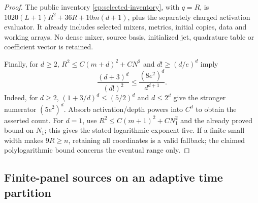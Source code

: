 \begin{proof}
The public inventory \eqref{cp:selected-inventory}, with $q=R$,
is $1020(L+1)R^2+36R+10m(d+1)$, plus the separately charged
activation evaluator. It already includes selected mixers, metrics,
initial copies, data and working arrays. No dense mixer, source basis,
initialized jet, quadrature table or coefficient vector is retained.

Finally, for $d\ge2$, $R^2\le C(m+d)^2+CN^2$ and
$d!\ge(d/e)^d$ imply
\[
 \frac{(d+3)^d}{(d!)^2}
 \le\frac{(8e^2)^d}{d^{d+1}}.
\]
Indeed, for $d\ge2$, $(1+3/d)^d\le(5/2)^d$ and $d\le2^d$
give the stronger numerator $(5e^2)^d$. Absorb activation/depth
powers into $C^d$ to obtain the asserted count. For $d=1$, use
$R^2\le C(m+1)^2+CN_1^2$ and the already proved bound on $N_1$;
this gives the stated logarithmic exponent five. If a finite small
width makes $9R\ge n$, retaining all coordinates is a valid fallback;
the claimed polylogarithmic bound concerns the eventual range only.
\end{proof}

\subsection{Finite-panel sources on an adaptive time partition}

